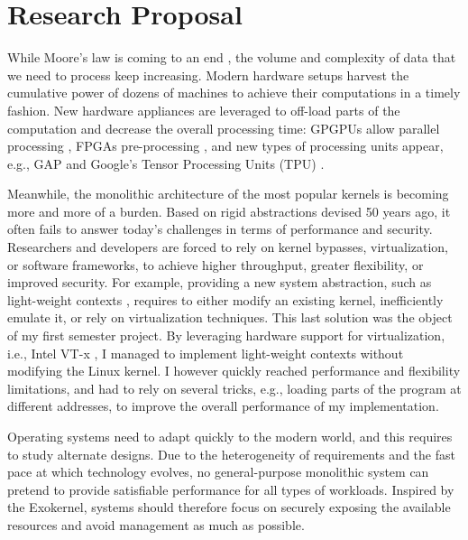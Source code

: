 \section{Research Proposal}

While Moore's law is coming to an end \cite{DBLP:journals/cse/TheisW17,DBLP:journals/computer/DeBenedictis17}, the volume and complexity of data that we need to process keep increasing.
Modern hardware setups harvest the cumulative power of dozens of machines to achieve their computations in a timely fashion.
New hardware appliances are leveraged to off-load parts of the computation and decrease the overall processing time: GPGPUs allow parallel processing \cite{DBLP:journals/pvldb/YuanL013,DBLP:conf/damon/KaldeweyLMV12,DBLP:journals/pvldb/Ailamaki15}, FPGAs pre-processing \cite{DBLP:journals/cacm/PutnamCCCCDEFGG16}, and new types of processing units appear, e.g., GAP \cite{DARPAGAP} and Google's Tensor Processing Units (TPU) \cite{GoogleTPU}.

Meanwhile, the monolithic architecture of the most popular kernels is becoming more and more of a burden.
Based on rigid abstractions devised 50 years ago, it often fails to answer today's challenges in terms of performance and security.
Researchers and developers are forced to rely on kernel bypasses, virtualization, or software frameworks, to achieve higher throughput, greater flexibility, or improved security.
For example, providing a new system abstraction, such as light-weight contexts \cite{DBLP:conf/osdi/LittonVE0BD16}, requires to either modify an existing kernel, inefficiently emulate it, or rely on virtualization techniques.
This last solution was the object of my first semester project.
By leveraging hardware support for virtualization, i.e., Intel VT-x \cite{DBLP:journals/computer/UhligNRSMABKLS05}, I managed to implement light-weight contexts without modifying the Linux kernel.
I however quickly reached performance and flexibility limitations, and had to rely on several tricks, e.g., loading parts of the program at different addresses, to improve the overall performance of my implementation.

Operating systems need to adapt quickly to the modern world, and this requires to study alternate designs.
Due to the heterogeneity of requirements and the fast pace at which technology evolves, no general-purpose monolithic system can pretend to provide satisfiable performance for all types of workloads.
Inspired by the Exokernel, systems should therefore focus on securely exposing the available resources and avoid management as much as possible.

